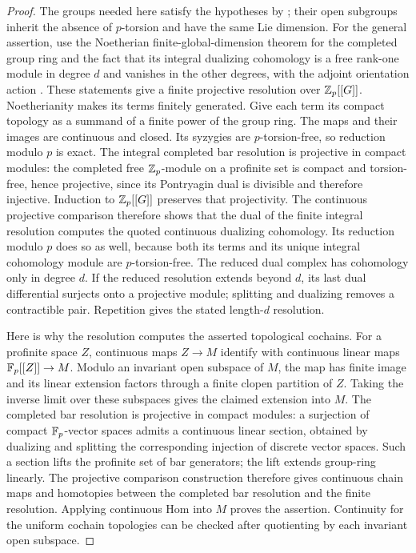 \begin{proof}
The groups needed here satisfy the hypotheses by
; their open subgroups inherit the absence
of $p$-torsion and have the same Lie dimension.
For the general assertion, use the Noetherian finite-global-dimension
theorem for the completed
group ring \cite[Proposition~3.3]{AW} and the fact that its integral
dualizing cohomology is a free
rank-one module in degree $d$ and vanishes in the other degrees, with
the adjoint orientation action
\cite[Proposition~4.16 and Remark~4.23]{BGHS}.
These statements give a finite projective resolution over
$\mathbb Z_p[[G]]$.  Noetherianity makes its terms finitely generated.  Give each
term its compact topology as a summand of a finite power of the group
ring.  The maps and their images are continuous and closed.  Its syzygies
are $p$-torsion-free, so reduction modulo $p$ is exact.
The integral completed bar resolution is projective in compact modules:
the completed free $\mathbb Z_p$-module on a profinite set is compact and
torsion-free, hence projective, since its Pontryagin dual is divisible
and therefore injective.  Induction to $\mathbb Z_p[[G]]$ preserves that
projectivity.  The continuous projective comparison therefore shows
that the dual of the finite integral resolution computes the quoted
continuous dualizing cohomology.  Its reduction modulo $p$ does so as
well, because both its terms and its unique integral cohomology module
are $p$-torsion-free.  The reduced dual complex
has cohomology only in degree $d$.  If the reduced resolution extends
beyond $d$, its last dual differential surjects onto a projective module;
splitting and dualizing removes a contractible pair.  Repetition gives
the stated length-$d$ resolution.

Here is why the resolution computes the asserted topological cochains.
For a profinite space $Z$, continuous maps $Z\to M$ identify with
continuous linear maps $\mathbb F_p[[Z]]\to M$.  Modulo an invariant open
subspace of $M$, the map has finite image and its linear extension
factors through a finite clopen partition of $Z$.  Taking the inverse
limit over these subspaces gives the claimed extension into $M$.
The completed bar resolution is projective in compact modules: a
surjection of compact $\mathbb F_p$-vector spaces admits a continuous linear
section, obtained by dualizing and splitting the corresponding injection
of discrete vector spaces.  Such a section lifts the profinite set of
bar generators; the lift extends group-ring linearly.  The projective
comparison construction therefore gives continuous chain maps and
homotopies between the completed bar resolution and the finite
resolution.  Applying continuous Hom into $M$ proves the assertion.
Continuity for the uniform cochain topologies can be checked after
quotienting by each invariant open subspace.


\end{proof}
